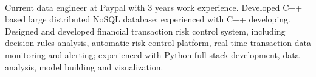 \documentclass[11pt, a4paper, UTF8]{awesome-cv}
\begin{document}
\makecvheader[R]

\makecvfooter
  {\ }
  {\ }
  {\ }




\begin{cvparagraph}
Current data engineer at Paypal with 3 years work experience. Developed C++ based large distributed NoSQL database; experienced with C++ developing. Designed and developed financial transaction risk control system, including decision rules analysis, automatic risk control platform, real time transaction data monitoring and alerting; experienced with Python full stack development, data analysis, model building and visualization.
\end{cvparagraph}
\end{document}
